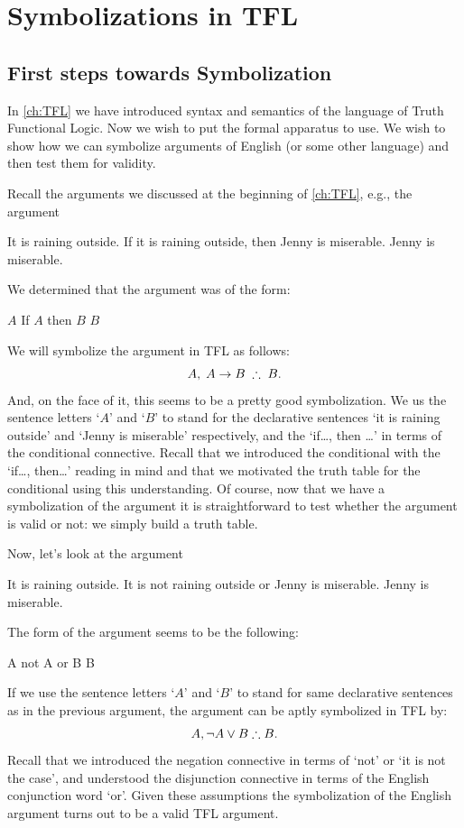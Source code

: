 \part{Symbolizations in TFL}
\label{ch:TFLsymb}
\chapter{First steps towards Symbolization}
In \cref{ch:TFL} we have introduced syntax and semantics of the language of Truth Functional Logic. Now we wish to put the formal apparatus to use. We wish to show how we can symbolize arguments of English (or some other language) and then test them for validity.

Recall the arguments we discussed at the beginning of \cref{ch:TFL}, e.g., the argument
\begin{earg}
		\prem It is raining outside.
		\prem If it is raining outside, then Jenny is miserable.
		\conc Jenny is miserable.
	\end{earg}

We determined that the argument was of the form:
\begin{earg}
\prem	$A$
\prem	If $A$ then $B$
\conc $B$
\end{earg}

 We will symbolize the argument in TFL as follows:
 $$A,\;A\eif B\;\therefore\; B.$$
And, on the face of it, this seems to be a pretty good symbolization.  We us the sentence letters `$A$' and `$B$' to stand for the declarative sentences `it is raining outside' and `Jenny is miserable' respectively, and the `if\ldots, then \ldots' in terms of the conditional connective. Recall that we introduced the conditional with the `if\ldots, then\ldots' reading in mind and that we motivated the truth table for the conditional using this understanding. Of course, now that we have a symbolization of the argument it is straightforward to test whether the argument is valid or not: we simply build a truth table.

Now, let's look at the argument
\begin{earg}
		\prem It is raining outside.
		\prem  It is not raining outside or Jenny is miserable.
		\conc Jenny is miserable.
	\end{earg}
The form of the argument seems to be the following:
\begin{earg}
		\prem A
		\prem  not A or B
		\conc B
	\end{earg}
If we use the sentence letters `$A$' and `$B$' to stand for same declarative sentences as in the previous argument, the argument can be aptly symbolized in TFL by:
$$A,\enot A\eor B\therefore B.$$
Recall that we introduced the negation connective in terms of `not' or `it is not the case', and understood the disjunction connective in terms of the English conjunction word `or'. Given these assumptions the symbolization of the English argument turns out to be a valid TFL argument.

